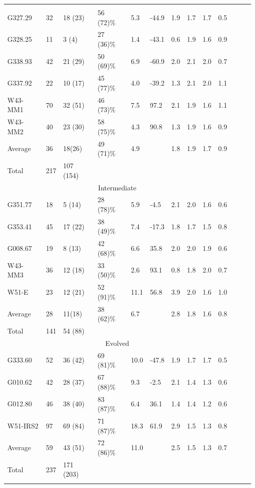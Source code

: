 \documentclass[longauth]{aa} %
\begin{document}
\begin{appendix}
\begin{table}[htbp!]
\begin{threeparttable}[c]
\begin{tabular}{lllllllllllll}
\hline \noalign {\smallskip}
\multicolumn{10}{c}{Young} \\
G327.29 & 32 & 18 (23)&  56 (72)\% & 5.3 & -44.9 & 1.9  & 1.7 & 1.7 & 0.5 \\
G328.25 & 11 & 3 (4)&  27 (36)\% & 1.4 & -43.1 & 0.6  & 1.9 & 1.6 & 0.9 \\
G338.93 & 42 & 21 (29)&  50 (69)\% & 6.9 & -60.9 & 2.0  & 2.1 & 2.0 & 0.7 \\
G337.92 & 22 & 10 (17)&  45 (77)\% & 4.0 & -39.2 & 1.3  & 2.1 & 2.0 & 1.1 \\
W43-MM1 & 70 & 32 (51)&  46 (73)\% & 7.5 & 97.2 & 2.1  & 1.9 & 1.6 & 1.1 \\
W43-MM2 & 40 & 23 (30)&  58 (75)\% & 4.3 & 90.8 & 1.3  & 1.9 & 1.6 & 0.9 \\
Average &  36 & 18(26) & 49 (71)\% &  4.9 &  & 1.8  & 1.9 & 1.7 & 0.9 \\
Total &  217 & 107 (154)  \\
\hline
\multicolumn{10}{c}{Intermediate} \\
G351.77 & 18 & 5 (14)&  28 (78)\% & 5.9 & -4.5 & 2.1  & 2.0 & 1.6 & 0.6 \\
G353.41 & 45 & 17 (22)&  38 (49)\% & 7.4 & -17.3 & 1.8  & 1.7 & 1.5 & 0.8 \\
G008.67 & 19 & 8 (13)&  42 (68)\% & 6.6 & 35.8 & 2.0  & 2.0 & 1.9 & 0.6 \\
W43-MM3 & 36 & 12 (18)&  33 (50)\% & 2.6 & 93.1 & 0.8  & 1.8 & 2.0 & 0.7 \\
W51-E & 23 & 12 (21)&  52 (91)\% & 11.1 & 56.8 & 3.9  & 2.0 & 1.6 & 1.0 \\
Average &  28 & 11(18) & 38 (62)\% &  6.7 &  & 2.8  & 1.8 & 1.6 & 0.8 \\
Total &  141 & 54 (88)  \\
\hline
\multicolumn{10}{c}{Evolved} \\
G333.60 &  52 & 36 (42) &  69 (81)\% & 10.0 & -47.8 & 1.9  & 1.7 & 1.7 & 0.5 \\
G010.62 &  42 & 28 (37) &  67 (88)\% & 9.3 & -2.5 & 2.1  & 1.4 & 1.3 & 0.6 \\
G012.80 &  46 & 38 (40) &  83 (87)\% & 6.4 & 36.1 & 1.4  & 1.4 & 1.2 & 0.6 \\
W51-IRS2 &  97 & 69 (84) &  71 (87)\% & 18.3 & 61.9 & 2.9  & 1.5 & 1.3 & 0.8 \\
Average &  59 & 43 (51) & 72 (86)\% &  11.0 &  & 2.5  & 1.5 & 1.3 & 0.7 \\
Total &  237 & 171 (203)  \\
\hline \noalign {\smallskip}
\end{tabular}

\end{threeparttable}
\end{table}
\end{appendix}
\end{document}
